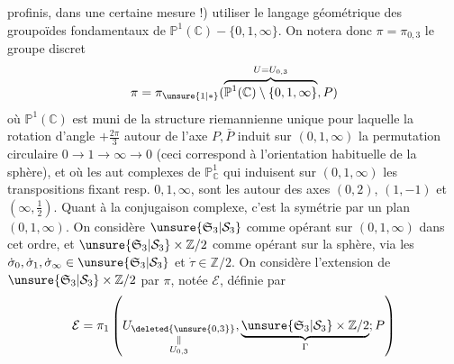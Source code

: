 profinis, dans une certaine mesure !) utiliser le langage géométrique des groupoïdes fondamentaux de $\mathbb P^1(\mathbb C)-\{0,1,\infty\}$. On  notera donc $\pi=\pi_{0,3}$ le groupe discret
\[
\pi=\pi_{\unsure{1|*}}(\overbrace{\mathbb P^1(\mathbb C)\setminus\{0,1,\infty\}}^{U=U_{0,3}},P)
\]
où $\mathbb P^1(\mathbb C)$ est muni de la structure  riemannienne  unique pour laquelle la rotation \inserted{$\dot\rho$} d'angle $+\frac{2\pi}{3}$ autour de l'axe $P,\bar P$  induit sur $(0,1,\infty)$ la permutation circulaire $0\longrightarrow1\longrightarrow\infty\longrightarrow0$ (ceci correspond à l'orientation habituelle de la sphère), et où les aut complexes  de $\mathbb P^1_{\mathbb C}$ qui   induisent  sur $(0,1,\infty)$ les transpositions fixant resp. $0,1,\infty$, sont  les   autour des axes  $(0,2)$, $(1,-1)$ et $(\infty,\frac12)$.
Quant à la conjugaison complexe, c'est la symétrie par un plan $(0,1,\infty)$. On considère $\unsure{\mathfrak S_3|\mathcal S_3}$ comme opérant sur $(0,1,\infty)$ dans cet ordre, et $\unsure{\mathfrak S_3|\mathcal S_3}\times\mathbb Z/2$ comme opérant sur la sphère, via les $\dot\sigma_0,\dot\sigma_1,\dot\sigma_\infty\in\unsure{\mathfrak S_3|\mathcal S_3}$ et $\dot\tau\in\mathbb Z/2$. On considère l'extension  de $\unsure{\mathfrak S_3|\mathcal S_3}\times\mathbb Z/2$ par $\pi$, notée  $\mathcal E$, définie par
\[
\mathcal E=\pi_1\left(\underset{\substack{\Vert\\U_{0,3}}}{U_{\deleted{\unsure{0,3}}}},\underbrace{\unsure{\mathfrak S_3|\mathcal S_3}\times\mathbb Z/2}_{\Gamma};P\right)
\]
